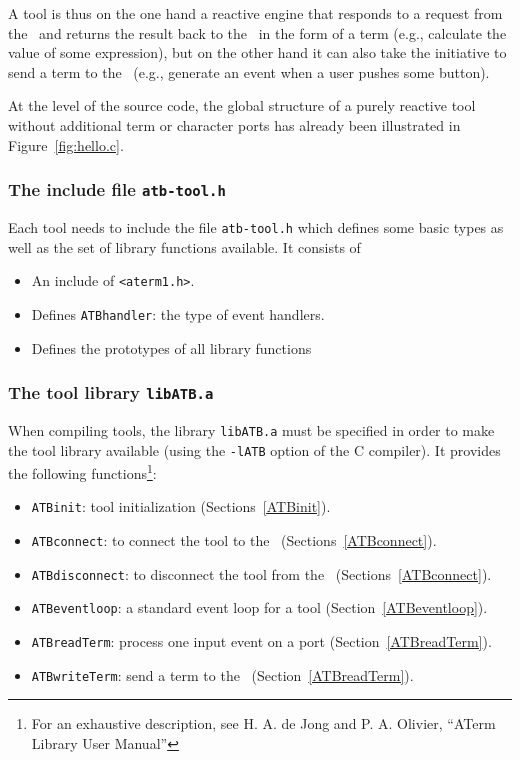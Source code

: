 \documentclass[twoside]{article} %
\begin{document}
A tool is thus on the one hand a reactive engine that responds to a
request from the \TB\ and returns the result back to the \TB\ in the
form of a term (e.g., calculate the value of some expression), but on
the other hand it can also take the initiative to send a term to the
\TB\   (e.g., generate an event when a user pushes some button).

At the level of the source code, the global structure of a purely
reactive tool without additional term or character ports
has already
been illustrated in Figure~\ref{fig:hello.c}.

\subsubsection{The include file {\tt atb-tool.h}}

Each tool needs to include the file {\tt atb-tool.h}
which defines some basic types as well as the set
of library functions available.
It consists of
\begin{itemize}
\item An include of {\tt <aterm1.h>}.
\item Defines {\tt ATBhandler}: the type of event handlers.
\item Defines the prototypes of all library functions
\end{itemize}

\subsubsection{The tool library {\tt libATB.a}}

When compiling tools, the library {\tt libATB.a} must be specified in order to
make the tool library available (using the {\tt -lATB} option of the C
compiler). It provides the following functions\footnote{For an
  exhaustive description, see H. A. de Jong and P. A. Olivier, ``ATerm Library
  User Manual''}:

\begin{itemize}
\item {\tt ATBinit}: tool initialization (Sections~\ref{ATBinit}).

\item {\tt ATBconnect}: to connect the tool to the \TB\
  (Sections~\ref{ATBconnect}).

\item {\tt ATBdisconnect}: to disconnect the tool from the \TB\ (Sections~\ref{ATBconnect}).

\item {\tt ATBeventloop}: a standard event loop for a tool
  (Section~\ref{ATBeventloop}).

\item {\tt ATBreadTerm}: process one input event on a port (Section~\ref{ATBreadTerm}).

\item {\tt ATBwriteTerm}: send a term to the \TB\ (Section~\ref{ATBreadTerm}).

\end{itemize}
\end{document}
